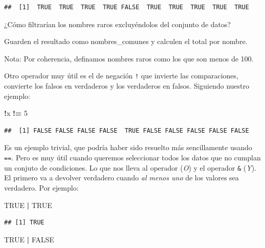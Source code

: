 \documentclass[]{book}
\newenvironment{Shaded}{\begin{snugshade}}{\end{snugshade}}
\newcommand{\DecValTok}[1]{\textcolor[rgb]{0.00,0.00,0.81}{#1}}
\newcommand{\NormalTok}[1]{#1}
\newcommand{\OperatorTok}[1]{\textcolor[rgb]{0.81,0.36,0.00}{\textbf{#1}}}
\newcommand{\OtherTok}[1]{\textcolor[rgb]{0.56,0.35,0.01}{#1}}
\newcommand{\StringTok}[1]{\textcolor[rgb]{0.31,0.60,0.02}{#1}}
\theoremstyle{definition}
\theoremstyle{definition}
\theoremstyle{definition}
\theoremstyle{remark}
\let\BeginKnitrBlock\begin \let\EndKnitrBlock\end
\begin{document}
\begin{verbatim}
##  [1]  TRUE  TRUE  TRUE  TRUE FALSE  TRUE  TRUE  TRUE  TRUE  TRUE
\end{verbatim}

\BeginKnitrBlock{exercise}[Nombres comunes]
\protect\hypertarget{exr:nombre-comun}{}{\label{exr:nombre-comun}
{} }¿Cómo filtrarían los nombres raros
excluyéndolos del conjunto de datos?

Guarden el resultado como nombres\_comunes y calculen el total por
nombre.

Nota: Por coherencia, definamos nombres raros como los que son menos de
100.
\EndKnitrBlock{exercise}

Otro operador muy útil es el de negación \texttt{!} que invierte las
comparaciones, convierte los falsos en verdaderos y los verdaderos en
falsos. Siguiendo nuestro ejemplo:

\begin{Shaded}
\begin{Highlighting}[]
\OperatorTok{!}\NormalTok{x }\OperatorTok{!=}\StringTok{ }\DecValTok{5}
\end{Highlighting}
\end{Shaded}

\begin{verbatim}
##  [1] FALSE FALSE FALSE FALSE  TRUE FALSE FALSE FALSE FALSE FALSE
\end{verbatim}

Es un ejemplo trivial, que podría haber sido resuelto más sencillamente
usando \texttt{==}. Pero es muy útil cuando queremos seleccionar todos
los datos que no cumplan un conjuto de condiciones. Lo que nos lleva al
operador \texttt{\textbar{}} (\emph{O}) y el operador \texttt{\&}
(\emph{Y}). El primero va a devolver verdadero cuando \emph{al menos
uno} de los valores sea verdadero. Por ejemplo:

\begin{Shaded}
\begin{Highlighting}[]
\OtherTok{TRUE} \OperatorTok{|}\StringTok{ }\OtherTok{TRUE}
\end{Highlighting}
\end{Shaded}

\begin{verbatim}
## [1] TRUE
\end{verbatim}

\begin{Shaded}
\begin{Highlighting}[]
\OtherTok{TRUE} \OperatorTok{|}\StringTok{ }\OtherTok{FALSE}
\end{Highlighting}
\end{Shaded}
\end{document}

